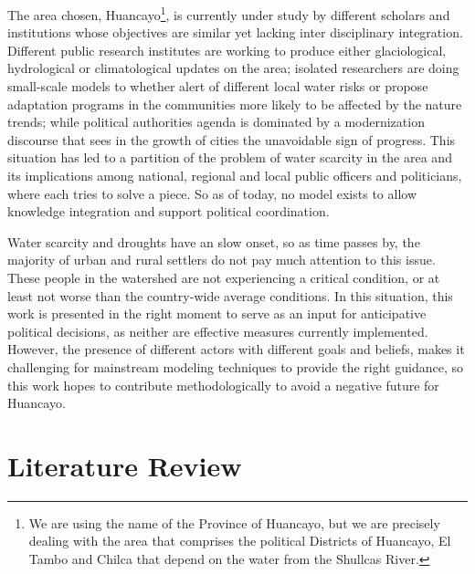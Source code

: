 \documentclass{article}
\begin{document}
The area chosen, Huancayo\footnote{We are using the name of the Province of Huancayo, but we are precisely dealing with the area that comprises the political Districts of Huancayo, El Tambo and Chilca that depend on the water from the Shullcas River.}, is currently under study by different scholars and institutions whose objectives are similar yet lacking inter disciplinary integration. Different public  research institutes are working to produce either glaciological, hydrological or climatological updates on the area; isolated researchers are doing small-scale models to whether alert of different local water risks or propose adaptation programs in the communities more likely to be affected by the nature trends; while political authorities agenda is dominated by a modernization discourse that sees in the growth of cities the unavoidable sign of progress. This situation has led to a partition of the problem of water scarcity in the area and its implications among national, regional and local public officers and politicians, where each tries to solve a piece. So as of today, no model exists to allow  knowledge integration and support political coordination. 

Water scarcity and droughts have an slow onset, so as time passes by, the majority of urban and rural settlers do not pay much attention to this issue. These people in the watershed are not experiencing a critical condition, or at least not worse than the country-wide average conditions. In this situation, this work is presented in the right moment to serve as an input for  anticipative political decisions, as neither are effective measures currently implemented. However, the presence of different actors with different goals and beliefs, makes it challenging for mainstream modeling techniques to provide the right guidance, so this work hopes to contribute methodologically to avoid a negative future for Huancayo.

\section{Literature Review}
\end{document}
